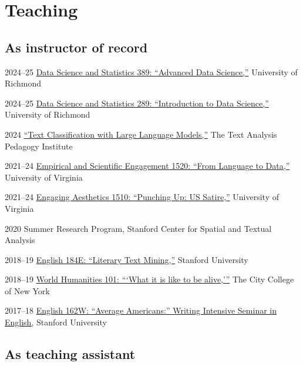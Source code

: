 \documentclass[12pt,letterpaper]{report}
\begin{document}
\section*{Teaching}

\subsection*{As instructor of record}

\begin{tablist}
	\item[2024--25] \tab{}\href{https://fredner.org/teaching}{Data Science and Statistics 389: \enquote{Advanced Data Science,}} University of Richmond
	\item[2024--25] \tab{}\href{https://fredner.org/teaching}{Data Science and Statistics 289: \enquote{Introduction to Data Science,}} University of Richmond
	\item[2024] \tab{}\href{https://fredner.org/teaching}{\enquote{Text Classification with Large Language Models,}} The Text Analysis Pedagogy Institute
	\item[2021--24] \tab{}\href{https://fredner.org/teaching}{Empirical and Scientific Engagement 1520: \enquote{From Language to Data,}} University of Virginia
	\item[2021--24] \tab{}\href{https://fredner.org/teaching}{Engaging Aesthetics 1510: \enquote{Punching Up: US Satire,}} University of Virginia
	\item[2020] \tab{}Summer Research Program, Stanford Center for Spatial and Textual Analysis
	\item[2018--19] \tab{}\href{https://fredner.org/teaching}{English 184E: \enquote{Literary Text Mining,}} Stanford University \\
	\item[2018--19] \tab{}\href{https://fredner.org/teaching}{World Humanities 101: \enquote{\enquote{What it is like to be alive,}}} The City College of New York
	\item[2017--18] \tab{}\href{https://fredner.org/teaching}{English 162W: \enquote{Average Americans:} Writing Intensive Seminar in English,} Stanford University
\end{tablist}

\subsection*{As teaching assistant}
\end{document}

